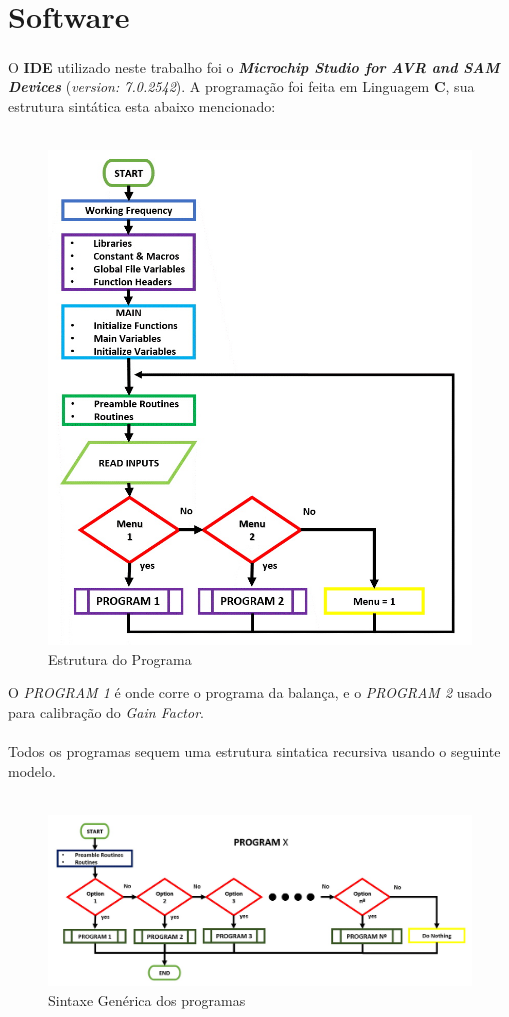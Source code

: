 \chapter{Software}
O \textbf{IDE} utilizado neste trabalho foi o \textbf{\textit{{Microchip Studio for AVR\textsuperscript{\textregistered} and SAM Devices}}} (\textit{version: 7.0.2542}). A programação foi feita em Linguagem \textbf{C}, sua estrutura sintática esta abaixo mencionado:
\\
\\
\begin{figure}[H]
	\centering
	\includegraphics[scale=0.6]{./image/PESTA/flowchart/Main_Program_1.jpg}
	\caption{Estrutura do Programa}
	\label{Main_Program_1}
\end{figure}
O \textit{PROGRAM 1} é onde corre o programa da balança, e o \textit{PROGRAM 2} usado para calibração do \textit{Gain Factor}.
\\
\\
Todos os programas sequem uma estrutura sintatica recursiva usando o seguinte modelo.
\\
\\
\begin{figure}[H]
	\centering
	\includegraphics[scale=0.40]{./image/PESTA/flowchart/Generic_structure.jpg}
	\caption{Sintaxe Genérica dos programas}
	\label{Geneic_structure}
\end{figure}
